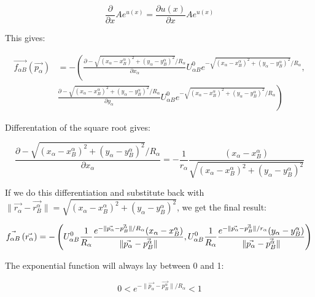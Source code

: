 \begin{equation}
\frac{\partial }{\partial x}Ae^{u(x)}=\frac{\partial u(x)}{\partial x}Ae^{u(x)}
\end{equation}

This gives:

\begin{equation}
\begin{split}
    \vec{f_{\alpha B}} \left( \vec{p_{\alpha}} \right) 
 & =-\left( \frac{\partial -\sqrt{(x_{\alpha}-x^{\alpha}_{B})^2+(y_{\alpha}-y^{\alpha}_B)^2} / R_{\alpha}}{\partial  x_{\alpha}}U^0_{\alpha B} e^{-\sqrt{(x_{\alpha}-x^{\alpha}_{B})^2+(y_{\alpha}-y^{\alpha}_B)^2} / R_{\alpha} } \right. , \\
& \left. \frac{\partial -\sqrt{(x_{\alpha}-x^{\alpha}_{B})^2+(y_{\alpha}-y^{\alpha}_B)^2} / R_{\alpha}}{\partial y_{\alpha}}U^0_{\alpha B} e^{- \sqrt{(x_{\alpha}-x^{\alpha}_{B})^2+(y_{\alpha}-y^{\alpha}_B)^2} / R_{\alpha} } \right)
\end{split}
\end{equation}

Differentation of the square root gives:

\begin{equation}
 \frac{\partial -\sqrt{(x_{\alpha}-x^{\alpha}_{B})^2+(y_{\alpha}-y^{\alpha}_B)^2} / R_{\alpha}}{\partial x_{\alpha}} =-\frac{1}{r_{\alpha}}\frac{(x_{\alpha}-x_{B}^{\alpha})}{\sqrt{(x_{\alpha}-x^{\alpha}_{B})^2+(y_{\alpha}-y^{\alpha}_B)^2} }
\end{equation}

If we do this differentiation and substitute back with
$\| \vec{r_{\alpha}} - \vec{r_{B}^{\alpha}} \|= \sqrt{(x_{\alpha}-x^{\alpha}_{B})^2+(y_{\alpha}-y^{\alpha}_B)^2}$, 
we get the final result:

\begin{equation}
    \vec{f_{\alpha B}} \left( \vec{r_{\alpha}} \right) 
=-\left(U^0_{\alpha B}\frac{1}{R_{\alpha}}\frac{e^{- \| \vec{p_{\alpha}} - \vec{p_{B}^{\alpha}} \| / R_{\alpha} } (x_{\alpha}-x_B^{\alpha})}{\| \vec{p_{\alpha}} - \vec{p_{B}^{\alpha}} \| },U^0_{\alpha B}\frac{1}{R_{\alpha}}\frac{e^{- \| \vec{p_{\alpha}} - \vec{p_{B}^{\alpha}} \| / r_{\alpha} } (y_{\alpha}-y_B^{\alpha})}{\| \vec{p_{\alpha}} - \vec{p_{B}^{\alpha}} \| }\right) \\
\end{equation}

The exponential function will always lay between 0 and 1:

\begin{equation}
0 < e^{ -\| \vec{p_{\alpha}} - \vec{p_{B}^{\alpha}} \| /R_\alpha} < 1
\end{equation}

